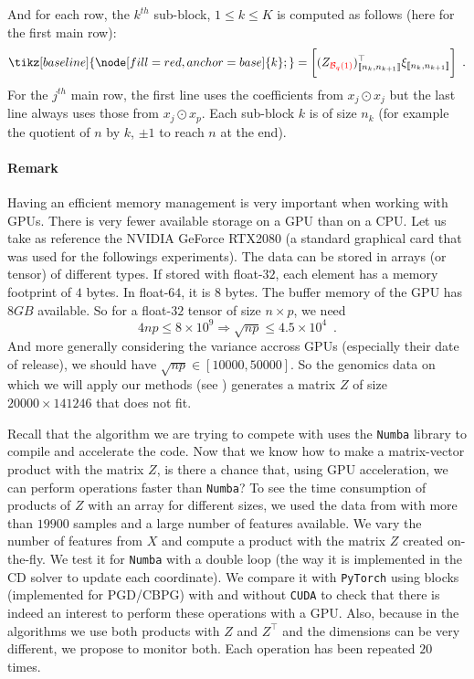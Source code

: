 \documentclass[../main.tex]{subfiles}
\begin{document}
\noindent
And for each row, the $k^{th}$ sub-block, $1\leq k\leq K$ is computed as follows
(here for the first main row):
\begin{align*}
\displaystyle
\tikz[baseline]{
	\node[fill=red,anchor=base]{k};
	}
= \bigg[(Z_{\textcolor{red}{\branch{q}{1}}})^\top_{\llbracket n_k,n_{k+1}\rrbracket}
\xi_{\llbracket n_k,n_{k+1}\rrbracket}\bigg]
\enspace.
\end{align*}
For the $j^{th}$ main row, the first line uses the coefficients from $x_j\odot x_j$
but the last line always uses those from $x_j\odot x_p$.
Each sub-block $k$ is of size $n_k$ (for example the quotient of $n$ by $k$,
$\pm 1$ to reach $n$ at the end).

\paragraph*{Remark}
Having an efficient memory management is very important when working with GPUs.
There is very fewer available storage on a GPU than on a CPU.
Let us take as reference the NVIDIA GeForce RTX2080
(a standard graphical card that was used for the followings experiments).
The data can be stored in arrays (or tensor) of different types.
If stored with float-$32$, each element has a memory footprint of $4$ bytes.
In float-$64$, it is $8$ bytes.
The buffer memory of the GPU has $8GB$ available.
So for a float-$32$ tensor of size $n\times p$, we need
\[4np \leq 8\times 10^9 \Longrightarrow \sqrt{np} \leq 4.5\times 10^4\enspace.\]
And more generally considering the variance accross GPUs
(especially their date of release), we should have $\sqrt{np}\in [10000, 50000]$.
So the genomics data on which we will apply our methods (see )
generates a matrix $Z$ of size $20000\times 141246$ that does not fit.

\medskip

Recall that the algorithm we are trying to compete with
\citep{Bascou_Lebre_Salmon20} uses the \texttt{Numba} library to compile and
accelerate the code.
Now that we know how to make a matrix-vector product with the matrix $Z$, is
there a chance that, using GPU acceleration, we can perform operations faster
than \texttt{Numba}?
To see the time consumption of products of $Z$ with an array for different sizes,
we used the data from  with more than $19900$ samples and a large
number of features available.
We vary the number of features from $X$ and compute a product with the matrix $Z$
created on-the-fly.
We test it for \texttt{Numba} with a double loop (the way it is implemented in the
CD solver to update each coordinate).
We compare it with \texttt{PyTorch} using blocks (implemented for PGD/CBPG)
with and without \texttt{CUDA} to check that there is indeed an interest to
perform these operations with a GPU.
Also, because in the algorithms we use both products with $Z$ and $Z^\top$ and
the dimensions can be very different, we propose to monitor both.
Each operation has been repeated $20$ times.
\end{document}
